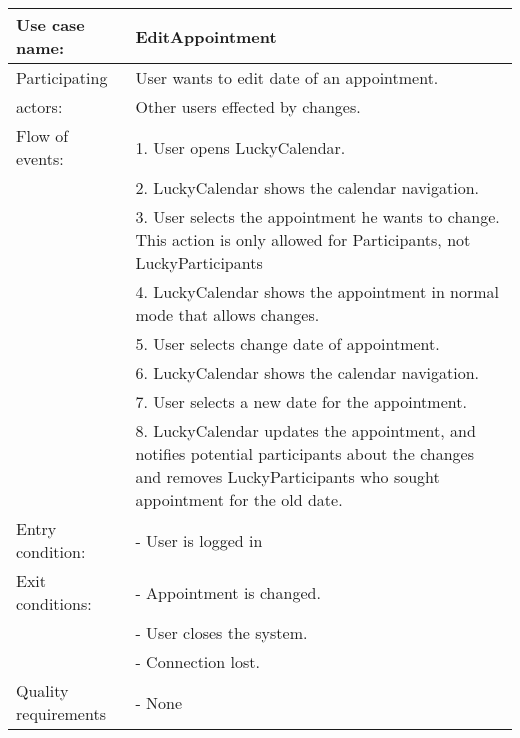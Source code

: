 {\tabulinesep=1.2mm
\begin{tabu}{ | p{3cm} | p{13cm} |}
    \hline
    Use case name: 			& 		EditAppointment\\ \hline
    Participating  			& 		User wants to edit date of an appointment. \\
    actors:					&		Other users effected by changes.\\ \hline
    Flow of events: 		& 		1. User opens LuckyCalendar. \\
							&		2. LuckyCalendar shows the calendar navigation.\\
							&		3. User selects the appointment he wants to change. This action is only allowed for Participants, not LuckyParticipants\\
							&		4. LuckyCalendar shows the appointment in normal mode that allows changes.\\
							&		5. User selects change date of appointment.\\
							&		6. LuckyCalendar shows the calendar navigation.\\
							&		7. User selects a new date for the appointment.\\
							&		8. LuckyCalendar updates the appointment, and notifies potential participants about the changes and removes LuckyParticipants who sought appointment for the old date.\\ \hline
    Entry condition: 		& 		- User is logged in  \\ \hline
	Exit conditions: 		&		- Appointment is changed.\\
							&		- User closes the system.\\
							&		- Connection lost.\\\hline
	Quality requirements	&	 	- None \\\hline
\end{tabu}
}